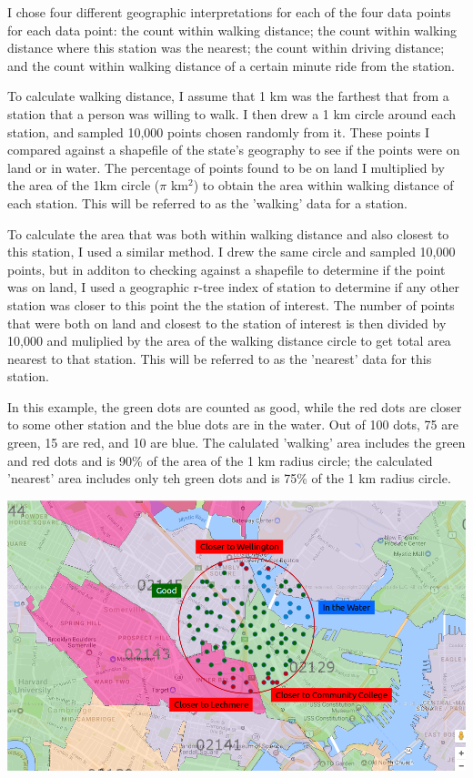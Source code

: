 \documentclass{article}
\begin{document}
I chose four different geographic interpretations for each of the four data points for each data point: the count within walking distance; the count within walking distance where this station was the nearest; the count within driving distance; and the count within walking distance of a certain minute ride from the station. 

To calculate walking distance, I assume that 1 km was the farthest that from a station that a person was willing to walk. I then drew a 1 km circle around each station, and sampled 10,000 points chosen randomly from it. These points I compared against a shapefile of the state's geography to see if the points were on land or in water. The percentage of points found to be on land I multiplied by the area of the 1km circle ($\pi$ km$^2$) to obtain the area within walking distance of each station. This will be referred to as the 'walking' data for a station.

To calculate the area that was both within walking distance and also closest to this station, I used a similar method. I drew the same circle and sampled 10,000 points, but in additon to checking against a shapefile to determine if the point was on land, I used a geographic r-tree index of station to determine if any other station was closer to this point the the station of interest. The number of points that were both on land and closest to the station of interest is then divided by 10,000 and muliplied by the area of the walking distance circle to get total area nearest to that station. This will be referred to as the 'nearest' data for this station.

In this example, the green dots are counted as good, while the red dots are closer to some other station and the blue dots are in the water. Out of 100 dots, 75 are green, 15 are red, and 10 are blue. The calulated 'walking' area includes the green and red dots and is 90\% of the area of the 1 km radius circle; the calculated 'nearest' area includes only teh green dots and is 75\% of the 1 km radius circle. 

\begin{center}\includegraphics[scale=0.6]{area_with_markup}\end{center}
\end{document}
